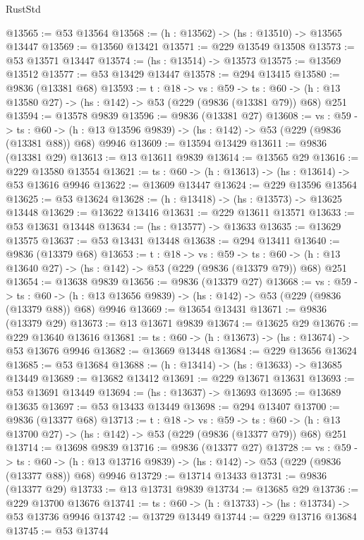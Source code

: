 \begin{lexlean}{RustStd}
\begin{coremodule}
@13565 := @53 @13564
@13568 := (h : @13562) -> (hs : @13510) -> @13565 @13447
@13569 := @13560 @13421
@13571 := @229 @13549 @13508
@13573 := @53 @13571 @13447
@13574 := (hs : @13514) -> @13573
@13575 := @13569 @13512
@13577 := @53 @13429 @13447
@13578 := @294 @13415
@13580 := @9836 (@13381 @68)
@13593 := {t : @18} ->
  {vs : @59} ->
  {ts : @60} -> (h : @13 @13580 @27) -> (hs : @142) -> @53 (@229 (@9836 (@13381 @79)) @68) @251
@13594 := @13578 @9839
@13596 := @9836 (@13381 @27)
@13608 := {vs : @59} ->
  {ts : @60} -> (h : @13 @13596 @9839) -> (hs : @142) -> @53 (@229 (@9836 (@13381 @88)) @68) @9946
@13609 := @13594 @13429
@13611 := @9836 (@13381 @29)
@13613 := @13 @13611 @9839
@13614 := @13565 @29
@13616 := @229 @13580 @13554
@13621 := {ts : @60} -> (h : @13613) -> (hs : @13614) -> @53 @13616 @9946
@13622 := @13609 @13447
@13624 := @229 @13596 @13564
@13625 := @53 @13624
@13628 := (h : @13418) -> (hs : @13573) -> @13625 @13448
@13629 := @13622 @13416
@13631 := @229 @13611 @13571
@13633 := @53 @13631 @13448
@13634 := (hs : @13577) -> @13633
@13635 := @13629 @13575
@13637 := @53 @13431 @13448
@13638 := @294 @13411
@13640 := @9836 (@13379 @68)
@13653 := {t : @18} ->
  {vs : @59} ->
  {ts : @60} -> (h : @13 @13640 @27) -> (hs : @142) -> @53 (@229 (@9836 (@13379 @79)) @68) @251
@13654 := @13638 @9839
@13656 := @9836 (@13379 @27)
@13668 := {vs : @59} ->
  {ts : @60} -> (h : @13 @13656 @9839) -> (hs : @142) -> @53 (@229 (@9836 (@13379 @88)) @68) @9946
@13669 := @13654 @13431
@13671 := @9836 (@13379 @29)
@13673 := @13 @13671 @9839
@13674 := @13625 @29
@13676 := @229 @13640 @13616
@13681 := {ts : @60} -> (h : @13673) -> (hs : @13674) -> @53 @13676 @9946
@13682 := @13669 @13448
@13684 := @229 @13656 @13624
@13685 := @53 @13684
@13688 := (h : @13414) -> (hs : @13633) -> @13685 @13449
@13689 := @13682 @13412
@13691 := @229 @13671 @13631
@13693 := @53 @13691 @13449
@13694 := (hs : @13637) -> @13693
@13695 := @13689 @13635
@13697 := @53 @13433 @13449
@13698 := @294 @13407
@13700 := @9836 (@13377 @68)
@13713 := {t : @18} ->
  {vs : @59} ->
  {ts : @60} -> (h : @13 @13700 @27) -> (hs : @142) -> @53 (@229 (@9836 (@13377 @79)) @68) @251
@13714 := @13698 @9839
@13716 := @9836 (@13377 @27)
@13728 := {vs : @59} ->
  {ts : @60} -> (h : @13 @13716 @9839) -> (hs : @142) -> @53 (@229 (@9836 (@13377 @88)) @68) @9946
@13729 := @13714 @13433
@13731 := @9836 (@13377 @29)
@13733 := @13 @13731 @9839
@13734 := @13685 @29
@13736 := @229 @13700 @13676
@13741 := {ts : @60} -> (h : @13733) -> (hs : @13734) -> @53 @13736 @9946
@13742 := @13729 @13449
@13744 := @229 @13716 @13684
@13745 := @53 @13744

\end{coremodule}
\end{lexlean}
